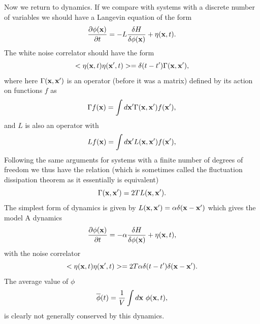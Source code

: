 Now we return to dynamics. If we compare with systems with a discrete number of variables we
should have a Langevin equation of the form
\begin{equation}
    \frac{\partial \phi({\bf x})}{\partial t}= -L \frac{\delta H}{\delta \phi({\bf x})} + \eta({\bf x},t).
\end{equation}
The white noise correlator should have the form
\begin{equation}
    < \eta({\bf x},t)\eta({\bf x}',t)> =\delta(t-t')\Gamma({\bf x},{\bf x'}),
\end{equation}
where here  $\Gamma({\bf x},{\bf x'})$ is an operator (before it was a matrix) defined by its action on functions $f$ as
\begin{equation}
    \Gamma f({\bf x}) = \int d{\bf x}' \Gamma({\bf x},{\bf x}')f({\bf x}'),
\end{equation}
and $L$ is also an operator with 
\begin{equation}
    L f({\bf x}) = \int d{\bf x}' L({\bf x},{\bf x}')f({\bf x}'),
\end{equation}
Following the same arguments for systems with a finite number of degrees of freedom we thus have the relation (which is sometimes called the fluctuation dissipation theorem as it essentially is equivalent)
\begin{equation} 
    \Gamma({\bf x},{\bf x}') =2T L({\bf x},{\bf x}').\label{gnoise}
\end{equation}
The simplest form of dynamics is given by $L({\bf x},{\bf x}')=\alpha\delta({\bf x}-{\bf x}')$ which gives the model A dynamics
\begin{equation}
    \frac{\partial \phi({\bf x})}{\partial t}= -\alpha \frac{\delta H}{\delta \phi({\bf x})} + \eta({\bf x},t),    \label{MA}
\end{equation}
with the noise correlator
\begin{equation}
    < \eta({\bf x},t)\eta({\bf x}',t)> =2T \alpha \delta(t-t')\delta({\bf x}-{\bf x'}).
\end{equation}
The average value of $\phi$ 
\begin{equation}
    \overline \phi(t) = \frac{1}{V}\int d{\bf x}\  \phi({\bf x},t),
\end{equation}
is clearly not generally conserved by this dynamics.

